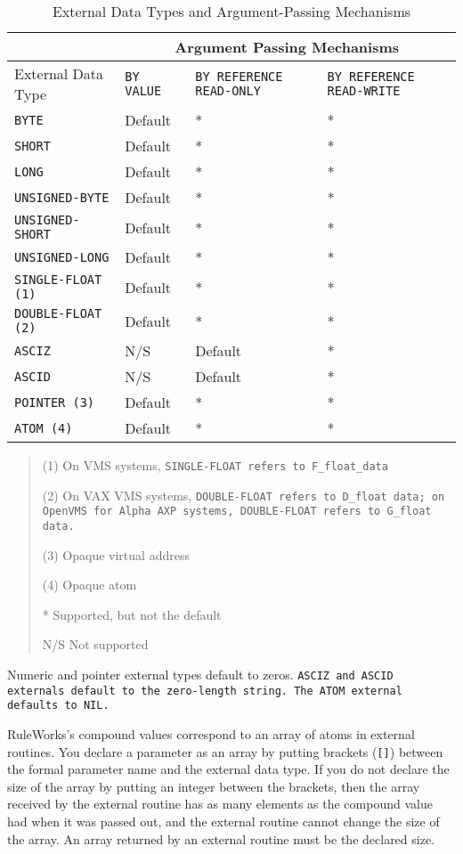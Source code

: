 \begin{table}[h]
  \begin{tabularx}{\columnwidth}{lXXX}
    \toprule
    & \multicolumn{3}{c}{Argument Passing Mechanisms} \\
    \midrule
    External Data Type & \tt{BY VALUE} & \tt{BY REFERENCE READ-ONLY} & \tt{BY REFERENCE READ-WRITE} \\ 
    \tt{BYTE} & Default & * & * \\
    \tt{SHORT} & Default & * & * \\
    \tt{LONG} & Default & * & * \\
    \tt{UNSIGNED-BYTE} & Default & * & * \\
    \tt{UNSIGNED-SHORT} & Default & * & * \\
    \tt{UNSIGNED-LONG} & Default & * & * \\
    \tt{SINGLE-FLOAT} (1) & Default  &      *       &      * \\
    \tt{DOUBLE-FLOAT} (2) & Default  &      *       &      * \\
    \tt{ASCIZ} & N/S      &   Default    &      * \\
    \tt{ASCID} & N/S      &   Default    &      * \\
    \tt{POINTER} (3) & Default  &      *       &      * \\
    \tt{ATOM} (4) & Default  &      *       &      * \\
    \bottomrule
  \end{tabularx}
  \begin{quote}
    (1) On VMS systems, \tt{SINGLE-FLOAT} refers to
    \verb|F_float_data|

    (2) On VAX VMS systems, \tt{DOUBLE-FLOAT} refers to
    \verb|D_float data|; on OpenVMS for Alpha AXP systems,
    \tt{DOUBLE-FLOAT} refers to \verb|G_float| data.

    (3) Opaque virtual address

    (4) Opaque atom

    * Supported, but not the default

    N/S Not supported
  \end{quote}
  \caption{External Data Types and Argument-Passing Mechanisms}
  \label{t:6-1}
\end{table}

Numeric and pointer external types default to zeros. \tt{ASCIZ} and
\tt{ASCID} externals default to the zero-length string. The \tt{ATOM}
external defaults to \tt{NIL}.

RuleWorks's compound values correspond to an array of atoms in
external routines. You declare a parameter as an array by putting
brackets (\verb|[]|) between the formal parameter name and the external
data type. If you do not declare the size of the array by putting an
integer between the brackets, then the array received by the external
routine has as many elements as the compound value had when it was
passed out, and the external routine cannot change the size of the
array. An array returned by an external routine must be the declared
size.

